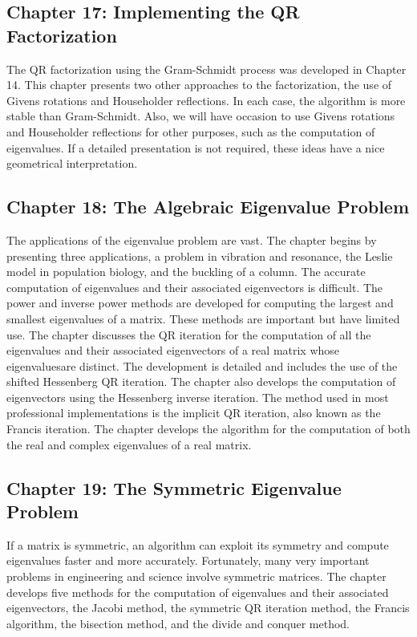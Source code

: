 \documentclass[../main.tex]{subfiles}
\begin{document}
\subsection*{Chapter 17: Implementing the QR Factorization}
The QR factorization using the Gram-Schmidt process was developed in Chapter 14. This chapter presents two other approaches to the factorization, the use of Givens rotations and Householder reflections. In each case, the algorithm is more stable than Gram-Schmidt. Also, we will have occasion to use Givens rotations and Householder reflections for other purposes, such as the computation of eigenvalues. If a detailed presentation is not required, these ideas have a nice geometrical interpretation.
\subsection*{Chapter 18: The Algebraic Eigenvalue Problem}
The applications of the eigenvalue problem are vast. The chapter begins by presenting three applications, a problem in vibration and resonance, the Leslie model in population biology, and the buckling of a column. The accurate computation of eigenvalues and their associated eigenvectors is difficult. The power and inverse power methods are developed for computing the largest and smallest eigenvalues of a matrix. These methods are important but have limited use. The chapter discusses the QR iteration for the computation of all the eigenvalues and their associated eigenvectors of a real matrix whose eigenvaluesare distinct. The development is detailed and includes the use of the shifted Hessenberg QR iteration. The chapter also develops the computation of eigenvectors using the Hessenberg inverse iteration. The method used in most professional implementations is the implicit QR iteration, also known as the Francis iteration. The chapter develops the algorithm for the computation of both the real and complex eigenvalues of a real matrix.

\subsection*{Chapter 19: The Symmetric Eigenvalue Problem}
If a matrix is symmetric, an algorithm can exploit its symmetry and compute eigenvalues faster and more accurately. Fortunately, many very important problems in engineering and science involve symmetric matrices. The chapter develops five methods for the computation of eigenvalues and their associated eigenvectors, the Jacobi method, the symmetric QR iteration method, the Francis algorithm, the bisection method, and the divide and conquer method.
\end{document}
